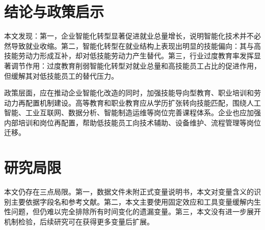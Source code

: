 \documentclass[UTF8,zihao=-4]{ctexart}
\begin{document}
\section{结论与政策启示}
本文发现：第一，企业智能化转型显著促进就业总量增长，说明智能化技术并不必然导致就业收缩。第二，智能化转型在就业结构上表现出明显的技能偏向：其与高技能劳动力形成互补，却对低技能劳动力产生替代。第三，行业过度教育率发挥显著调节作用：过度教育削弱智能化转型对就业总量和高技能员工占比的促进作用，但缓解其对低技能员工的替代压力。

政策层面，应在推动企业智能化改造的同时，加强技能导向型教育、职业培训和劳动力再配置机制建设。高等教育和职业教育应从学历扩张转向技能匹配，围绕人工智能、工业互联网、数据分析、智能制造运维等岗位完善课程体系。企业也应加强内部培训和岗位再配置，帮助低技能员工向技术辅助、设备维护、流程管理等岗位迁移。

\section*{研究局限}
本文仍存在三点局限。第一，数据文件未附正式变量说明书，本文对变量含义的识别主要依据字段名和参考文献。第二，本文主要使用固定效应和工具变量缓解内生性问题，但仍难以完全排除所有时间变化的遗漏变量。第三，本文没有进一步展开机制检验，后续研究可在获得更多变量后扩展。
\end{document}
